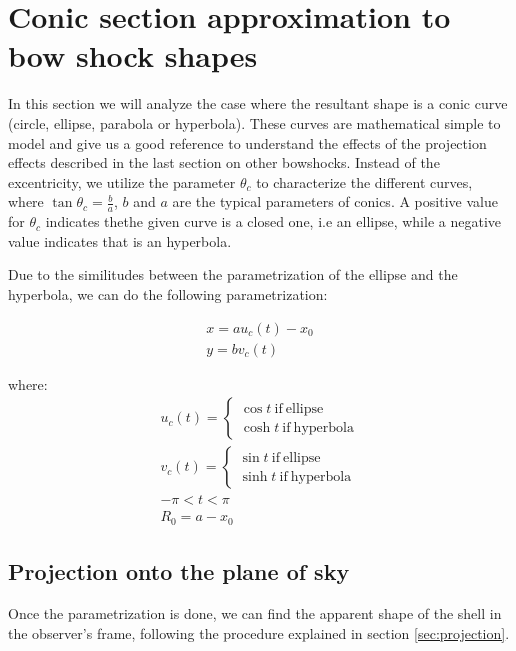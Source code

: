 \section{Conic section approximation to bow shock shapes}
\label{sec:conic}

In this section we will analyze the case where the resultant shape is a conic curve (circle, ellipse, parabola or hyperbola).
These curves are mathematical simple to model and give us a good reference to understand the effects of the projection effects
described in the last section on other bowshocks. Instead of the excentricity, we utilize the parameter $\theta_c$ to characterize the different curves, where
$\tan\theta_c = \frac{b}{a}$,  $b$ and $a$ are the typical parameters of conics. A positive value for $\theta_c$ indicates thethe given curve is a closed one, i.e
an ellipse, while a negative value indicates that is an hyperbola. %

Due to the similitudes between the parametrization of the ellipse and the hyperbola, we can do the following parametrization:

\begin{align}
x = au_c(t)-x_0 \\ 
y = bv_c(t)
\end{align}

where:
\begin{align}
u_c(t) = \left\lbrace \begin{array}{c}
\cos t ~\mathrm{if~ellipse} \\
\cosh t ~\mathrm{if~hyperbola}
\end{array}\right.\\
v_c(t) = \left\lbrace \begin{array}{c}
\sin t ~\mathrm{if~ellipse} \\
\sinh t ~\mathrm{if~hyperbola}
\end{array}\right. \\
-\pi < t < \pi \\
R_0 = a - x_0 
\end{align}

\subsection{Projection onto the plane of sky} 

Once the parametrization is done, we can find the apparent shape of the shell in the observer's frame, following the procedure explained in section \ref{sec:projection}.

